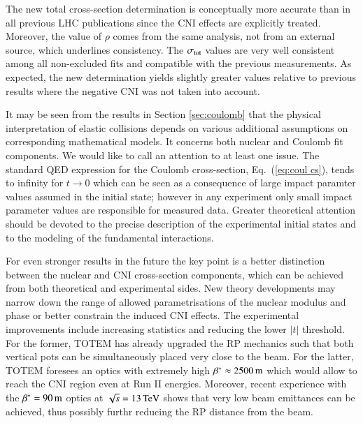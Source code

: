 The new total cross-section determination is conceptually more accurate than in all previous LHC publications since the CNI effects are explicitly treated. Moreover, the value of $\rho$ comes from the same analysis, not from an external source, which underlines consistency. The $\sigma_{\rm tot}$ values are very well consistent among all non-excluded fits and compatible with the previous measurements. As expected, the new determination yields slightly greater values relative to previous results where the negative CNI was not taken into account.

It may be seen from the results in Section \ref{sec:coulomb} that the physical interpretation of elastic collisions depends on various additional assumptions on corresponding mathematical models. It concerns both nuclear and Coulomb fit components. We would like to call an attention to at least one issue. The standard QED expression for the Coulomb cross-section, Eq.~(\ref{eq:coul cs}), tends to infinity for $t\to 0$ which can be seen as a consequence of large impact paramter values assumed in the initial state; however in any experiment only small impact parameter values are responsible for measured data. Greater theoretical attention should be devoted to the precise description of the experimental initial states and to the modeling of the fundamental interactions.

For even stronger results in the future the key point is a better distinction between the nuclear and CNI cross-section components, which can be achieved from both theoretical and experimental sides. New theory developments may narrow down the range of allowed parametrisations of the nuclear modulus and phase or better constrain the induced CNI effects. The experimental improvements include increasing statistics and reducing the lower $|t|$ threshold. For the former, TOTEM has already upgraded the RP mechanics such that both vertical pots can be simultaneously placed very close to the beam. For the latter, TOTEM foresees an optics with extremely high $\beta^* \approx 2500\,{\rm m}$ which would allow to reach the CNI region even at Run II energies. Moreover, recent experience with the $\beta^* = 90\,{\rm m}$ optics at $\sqrt s = 13\,{\rm TeV}$ shows that very low beam emittances can be achieved, thus possibly furthr reducing the RP distance from the beam.
